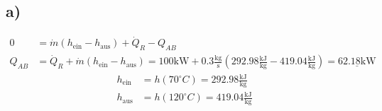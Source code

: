 

\subsection*{a)}
\begin{align*}
0 &= \dot{m} (h_{\text{ein}} - h_{\text{aus}}) + \dot{Q}_R - Q_{AB} \\
Q_{AB} &= \dot{Q}_R + \dot{m} (h_{\text{ein}} - h_{\text{aus}}) = 100 \text{kW} + 0.3 \frac{\text{kg}}{\text{s}} (292.98 \frac{\text{kJ}}{\text{kg}} - 419.04 \frac{\text{kJ}}{\text{kg}}) = \underline{62.18 \text{kW}}
\end{align*}
\begin{align*}
h_{\text{ein}} &= h(70^\circ C) = 292.98 \frac{\text{kJ}}{\text{kg}} \\
h_{\text{aus}} &= h(120^\circ C) = 419.04 \frac{\text{kJ}}{\text{kg}}
\end{align*}